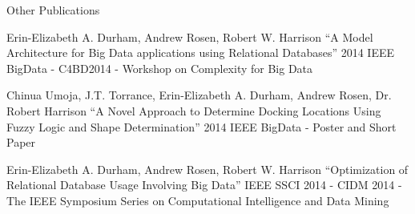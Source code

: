 \documentclass[11pt]{beamer}
\begin{document}
\begin{frame}{Other Publications}

	\begin{itemize}
		\footnotesize{
		\item  Erin-Elizabeth A. Durham, Andrew Rosen, Robert W. Harrison
		``A Model Architecture for Big Data applications using Relational Databases''
		2014 IEEE BigData - C4BD2014 - Workshop on Complexity for Big Data  
		\item Chinua Umoja, J.T. Torrance, Erin-Elizabeth A. Durham, Andrew Rosen, Dr. Robert Harrison
		``A Novel Approach to Determine Docking Locations Using Fuzzy Logic and Shape Determination''
		2014 IEEE BigData - Poster and Short Paper 
		\item  Erin-Elizabeth A. Durham, Andrew Rosen, Robert W. Harrison
		``Optimization of Relational Database Usage Involving Big Data'' 
		IEEE SSCI 2014 - CIDM 2014 - The IEEE Symposium Series on Computational Intelligence and Data Mining }
	\end{itemize}
\end{frame}
\end{document}
